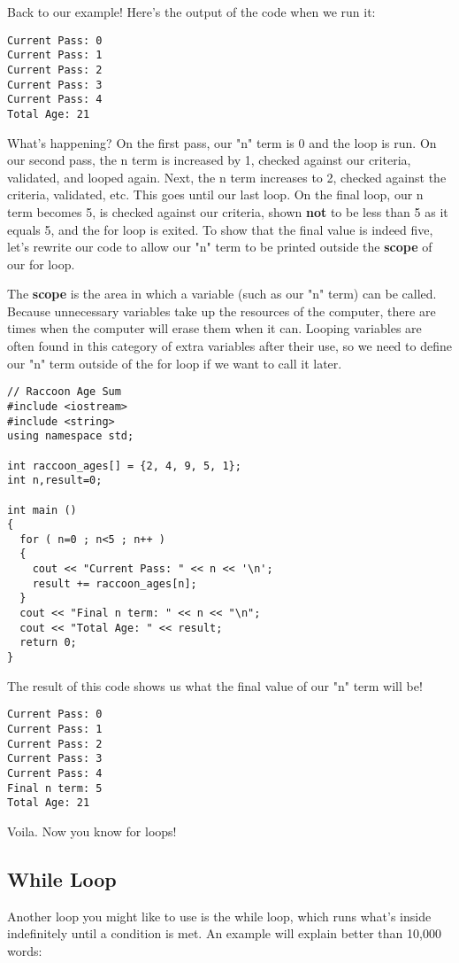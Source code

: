\documentclass[a4paper]{article}
\begin{document}
Back to our example! Here's the output of the code when we run it:

\begin{verbatim}
Current Pass: 0
Current Pass: 1
Current Pass: 2
Current Pass: 3
Current Pass: 4
Total Age: 21 
\end{verbatim}

What's happening? On the first pass, our "n" term is 0 and the loop is run. On our second pass, the n term is increased by 1, checked against our criteria, validated, and looped again. Next, the n term increases to 2, checked against the criteria, validated, etc. This goes until our last loop. On the final loop, our n term becomes 5, is checked against our criteria, shown \textbf{not} to be less than 5 as it equals 5, and the for loop is exited. To show that the final value is indeed five, let's rewrite our code to allow our "n" term to be printed outside the \textbf{scope} of our for loop. 

The \textbf{scope} \cite{scope} is the area in which a variable (such as our "n" term) can be called. Because unnecessary variables take up the resources of the computer, there are times when the computer will erase them when it can. Looping variables are often found in this category of extra variables after their use, so we need to define our "n" term outside of the for loop if we want to call it later.

\begin{verbatim}
// Raccoon Age Sum
#include <iostream>
#include <string>
using namespace std;

int raccoon_ages[] = {2, 4, 9, 5, 1};
int n,result=0;

int main ()
{
  for ( n=0 ; n<5 ; n++ )
  {
    cout << "Current Pass: " << n << '\n';
    result += raccoon_ages[n];
  }
  cout << "Final n term: " << n << "\n";
  cout << "Total Age: " << result;
  return 0;
}
\end{verbatim}

The result of this code shows us what the final value of our "n" term will be!

\begin{verbatim}
Current Pass: 0
Current Pass: 1
Current Pass: 2
Current Pass: 3
Current Pass: 4
Final n term: 5
Total Age: 21 
\end{verbatim}

Voila. Now you know for loops!

\newpage
\subsection{While Loop}
Another loop you might like to use is the while loop, which runs what's inside indefinitely until a condition is met. An example will explain better than 10,000 words:
\end{document}
